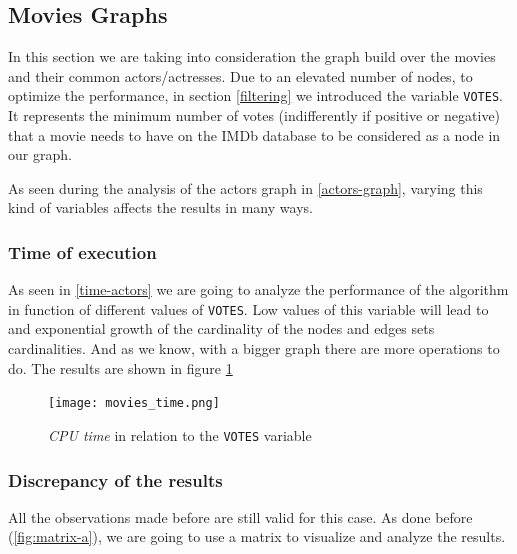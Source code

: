 \s
\newpage
\subsection{Movies Graphs}
In this section we are taking into consideration the graph build over the movies and their common actors/actresses. Due to an elevated number of nodes, to optimize the performance, in section \ref{filtering} we introduced the variable \texttt{VOTES}. It represents the minimum number of votes (indifferently if positive or negative) that a movie needs to have on the IMDb database to be considered as a node in our graph.

As seen during the analysis of the actors graph in \ref{actors-graph}, varying this kind of variables affects the results in many ways.

\subsubsection{Time of execution}

As seen in \ref{time-actors} we are going to analyze the performance of the algorithm in function of different values of \texttt{VOTES}. Low values of this variable will lead to and exponential growth of the cardinality of the nodes and edges sets cardinalities. And as we know, with a bigger graph there are more operations to do. The results are shown in figure \ref{fig:moves_time}

\begin{figure}[h!]
    \centering
    \texttt{[image: movies\_time.png]}
    \caption{\emph{CPU time} in relation to the \texttt{VOTES} variable}
    \label{fig:moves_time}
\end{figure}

\newpage


\subsubsection{Discrepancy of the results}

All the observations made before are still valid for this case. As done before (\ref{fig:matrix-a}), we are going to use a matrix to visualize and analyze the results.
\s

% 

